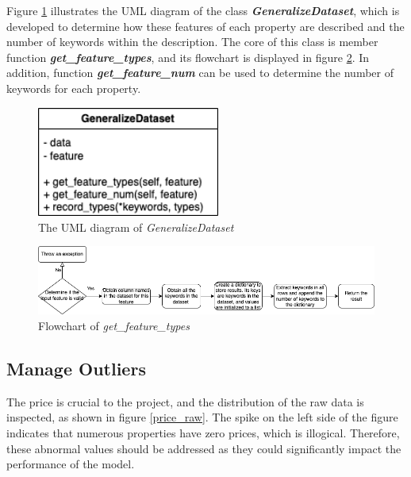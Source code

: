 \documentclass[12pt,twoside]{report}
\begin{document}
Figure \ref{uml_generalize_dataset} illustrates the UML diagram of the class \textit{\textbf{GeneralizeDataset}}, which is developed to determine how these features of each property are described and the number of keywords within the description. The core of this class is member function \textit{\textbf{get\_feature\_types}}, and its flowchart is displayed in figure \ref{generalize_dataset_get_feature_types}. In addition, function \textbf{\textit{get\_feature\_num}} can be used to determine the number of keywords for each property. 
\\

\begin{figure}[!htbp]
	\centering
	\includegraphics[width=6cm]{uml_generalize_dataset}
	\caption{The UML diagram of \textit{GeneralizeDataset}}
	\label{uml_generalize_dataset}
\end{figure}

\begin{figure}[!htbp]
	\centering
	\includegraphics[width=1\linewidth]{generalize_dataset_get_feature_types}
	\caption{Flowchart of \textit{get\_feature\_types}}
	\label{generalize_dataset_get_feature_types}
\end{figure}

\subsection{Manage Outliers}
The price is crucial to the project, and the distribution of the raw data is inspected, as shown in figure \ref{price_raw}. The spike on the left side of the figure indicates that numerous properties have zero prices, which is illogical. Therefore, these abnormal values should be addressed as they could significantly impact the performance of the model.
\end{document}
